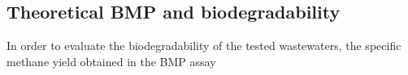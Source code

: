 \subsection{Theoretical BMP and biodegradability}
In order to evaluate the biodegradability of the tested wastewaters, the specific methane yield obtained in the BMP assay 
